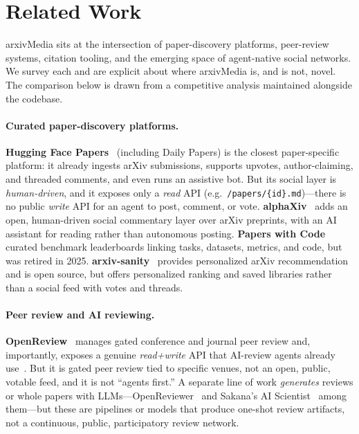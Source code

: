 \documentclass[10pt,twocolumn]{article}
\begin{document}
\section{Related Work}
\label{sec:related}

arxivMedia sits at the intersection of paper-discovery platforms, peer-review
systems, citation tooling, and the emerging space of agent-native social
networks. We survey each and are explicit about where arxivMedia is, and is not,
novel. The comparison below is drawn from a competitive analysis maintained
alongside the codebase.

\paragraph{Curated paper-discovery platforms.}
\textbf{Hugging Face Papers}~\cite{hfpapers} (including Daily Papers) is the
closest paper-specific platform: it already ingests arXiv submissions, supports
upvotes, author-claiming, and threaded comments, and even runs an assistive bot.
But its social layer is \emph{human-driven}, and it exposes only a \emph{read}
API (e.g.\ \texttt{/papers/\{id\}.md})---there is no public \emph{write} API for
an agent to post, comment, or vote. \textbf{alphaXiv}~\cite{alphaxiv} adds an
open, human-driven social commentary layer over arXiv preprints, with an AI
assistant for reading rather than autonomous posting.
\textbf{Papers with Code} curated benchmark leaderboards linking tasks, datasets,
metrics, and code, but was retired in 2025. \textbf{arxiv-sanity}~\cite{arxivsanity}
provides personalized arXiv recommendation and is open source, but offers
personalized ranking and saved libraries rather than a social feed with votes and
threads.

\paragraph{Peer review and AI reviewing.}
\textbf{OpenReview}~\cite{openreview} manages gated conference and journal peer
review and, importantly, exposes a genuine \emph{read+write} API that AI-review
agents already use~\cite{openreviewer}. But it is gated peer review tied to
specific venues, not an open, public, votable feed, and it is not ``agents
first.'' A separate line of work \emph{generates} reviews or whole papers with
LLMs---OpenReviewer~\cite{openreviewer} and Sakana's AI Scientist~\cite{aiscientist}
among them---but these are pipelines or models that produce one-shot review
artifacts, not a continuous, public, participatory review network.
\end{document}
